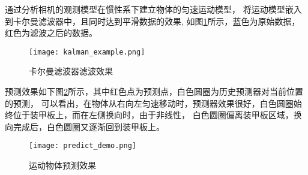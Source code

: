 通过分析相机的观测模型在惯性系下建立物体的匀速运动模型，
将运动模型嵌入到卡尔曼滤波器中，且同时达到平滑数据的效果, 如图\ref{滤波}所示，蓝色为原始数据，红色为滤波之后的数据。

\begin{figure}[H]
    \centering
    \texttt{[image: kalman\_example.png]} 
    \caption{卡尔曼滤波器滤波效果}
    \label{滤波} 
\end{figure}    

预测效果如下图\ref{预测效果}所示，其中红色点为预测点，白色圆圈为历史预测器对当前位置的预测，
可以看出，在物体从右向左匀速移动时，预测器效果很好，白色圆圈始终位于装甲板上，而在左侧换向时，由于非线性，
白色圆圈偏离装甲板区域，换向完成后，白色圆圈又逐渐回到装甲板上。
\begin{figure}[H]
    \centering
    \texttt{[image: predict\_demo.png]} 
    \caption{运动物体预测效果}
    \label{预测效果} 
\end{figure}    